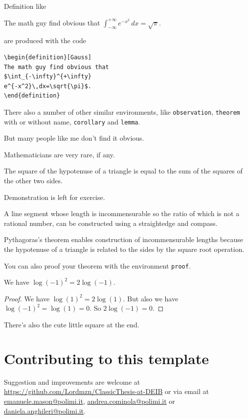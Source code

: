 Definition like
\begin{definition}[Gauss] 
The math guy find obvious that
$\int_{-\infty}^{+\infty}
e^{-x^2}\,dx=\sqrt{\pi}$. 
\end{definition}
are produced with the code 
\begin{verbatim}
\begin{definition}[Gauss] 
The math guy find obvious that
$\int_{-\infty}^{+\infty}
e^{-x^2}\,dx=\sqrt{\pi}$. 
\end{definition}
\end{verbatim}
There also a number of other similar environments, like \verb!observation!, \verb!theorem! with or without name, \verb!corollary! and \verb!lemma!.
\begin{observation}
But many people like me don't find it obvious.
\end{observation}
\begin{theorem} 
Mathematicians are very rare, if any.
\end{theorem} 
\begin{theorem}[Pythagorean]
The square of the hypotenuse of a triangle is equal to the sum of the squares of the other two sides.
\end{theorem}
Demonstration is left for exercise.
\begin{corollary}
A line segment whose length is incommensurable so the ratio of which is not a rational number, can be constructed using a straightedge and compass. 
\end{corollary}
\begin{lemma}
Pythagoras's theorem enables construction of incommensurable lengths because the hypotenuse of a triangle is related to the sides by the square root operation.
\end{lemma}
You can also proof your theorem with the environment \verb!proof!.
\begin{theorem}[Surprise]
We have $\log(-1)^2=2\log(-1)$.
\end{theorem} 
\begin{proof} 
We have $\log(1)^2 = 2\log(1)$.
But also we have $\log(-1)^2=\log(1)=0$.
So $2\log(-1)=0$.
\end{proof}
There's also the cute little square at the end.

\section{Contributing to this template}
Suggestion and improvements are welcome at \url{https://github.com/Lordmzn/ClassicThesis-at-DEIB} or via email at \url{emanuele.mason@polimi.it}, \url{andrea.cominola@polimi.it} or \url{daniela.anghileri@polimi.it}.